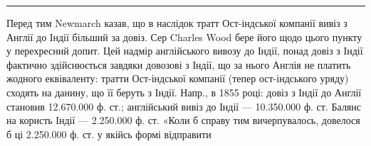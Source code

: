\pfbreak

Перед тим Newmarch казав, що в наслідок тратт Ост-індської компанії
вивіз з Англії до Індії більший за довіз. Сер Charles Wood бере його щодо
цього пункту у перехресний допит. Цей надмір англійського вивозу до Індії, понад
довіз з Індії фактично здійснюється завдяки довозові з Індії, що за нього Англія
не платить жодного еквіваленту: тратти Ост-індської компанії (тепер ост-індського
уряду) сходять на данину, що її беруть з Індії. Напр., в 1855 році:
довіз з Індії до Англії становив \num{12.670.000} ф. ст.; англійський вивіз до Індії —
\num{10.350.000} ф. ст. Балянс на користь Індії — \num{2.250.000} ф. ст. «Коли б справу
тим вичерпувалось, довелося б ці \num{2.250.000} ф. ст. у якійсь формі відправити
\parbreak{}  %
